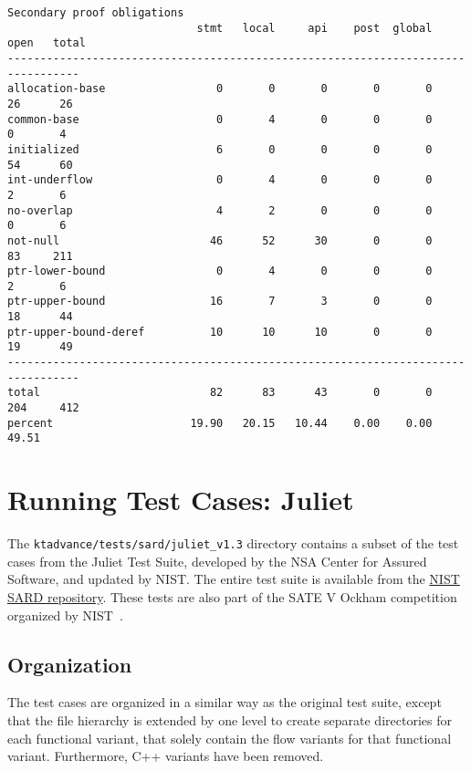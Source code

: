\documentclass[11pt]{article}
\begin{document}
\begin{scriptsize}
\begin{verbatim}
Secondary proof obligations
                             stmt   local     api    post  global    open   total
---------------------------------------------------------------------------------
allocation-base                 0       0       0       0       0      26      26
common-base                     0       4       0       0       0       0       4
initialized                     6       0       0       0       0      54      60
int-underflow                   0       4       0       0       0       2       6
no-overlap                      4       2       0       0       0       0       6
not-null                       46      52      30       0       0      83     211
ptr-lower-bound                 0       4       0       0       0       2       6
ptr-upper-bound                16       7       3       0       0      18      44
ptr-upper-bound-deref          10      10      10       0       0      19      49
---------------------------------------------------------------------------------
total                          82      83      43       0       0     204     412
percent                     19.90   20.15   10.44    0.00    0.00   49.51
\end{verbatim}
\end{scriptsize}

\section{Running Test Cases: Juliet}
\label{sec:juliettests}

The {\tt ktadvance/tests/sard/juliet\_v1.3} directory contains a subset of the 
test cases from the Juliet Test Suite, developed by the NSA Center for Assured 
Software, and updated by NIST. The entire test suite is available from the
\href{http://samate.nist.gov}{NIST SARD repository}. These tests are also part of the
SATE V Ockham competition organized by NIST~\cite{Ockham}.

\subsection{Organization}
The test cases are organized in a similar way as the original test suite, except 
that the file hierarchy is extended by one level to create separate directories 
for each functional variant, that solely contain the flow variants for that 
functional variant. Furthermore, C++ variants have been removed.
\end{document}

